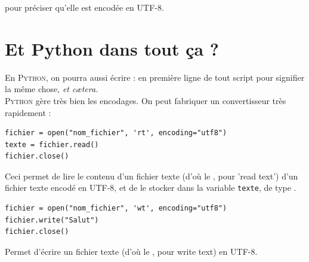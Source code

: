 pour préciser qu'elle est encodée en UTF-8.\\
\section{Et Python dans tout ça ?}
En \textsc{Python}, on pourra aussi écrire :  en première ligne de tout script pour signifier la même chose, \textit{et c\ae tera}.\\

\textsc{Python} gère très bien les encodages. On peut fabriquer un convertisseur très rapidement :

\begin{pyc}
    \begin{verbatim}
fichier = open("nom_fichier", 'rt', encoding="utf8")
texte = fichier.read()
fichier.close()
    \end{verbatim}
\end{pyc}

Ceci permet de lire le contenu d'un fichier texte (d'où le , pour 'read text') d'un fichier texte encodé en UTF-8, et de le stocker dans la
variable \texttt{texte}, de type .\\

\begin{pyc}
    \begin{verbatim}
fichier = open("nom_fichier", 'wt', encoding="utf8")
fichier.write("Salut")
fichier.close()	
    \end{verbatim}
\end{pyc}

Permet d'écrire un fichier texte (d'où le , pour write text) en UTF-8.\\

